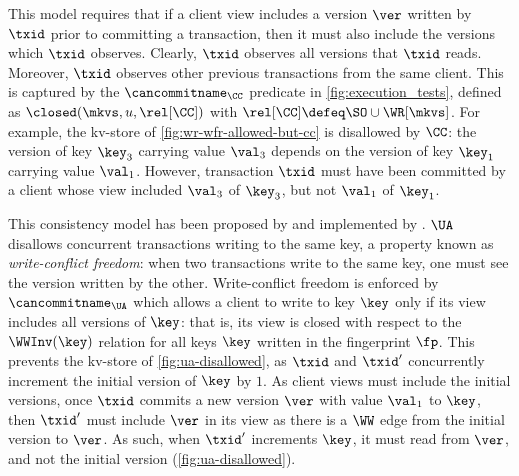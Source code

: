 This model requires that 
if a client view includes 
a version \(\ver\) written by \( \txid \) prior to committing a transaction, 
then it must also include the versions which \(\txid\) observes.
Clearly, \(\txid\) observes all versions that \(\txid\) reads. 
Moreover, \(\txid\) observes other previous transactions from the same client.
This is captured by the \(\cancommitname_{\CC}\) predicate in \cref{fig:execution_tests}, 
defined as \(\closed(\mkvs, u, \rel[\CC])\) with \(\rel[\CC] \defeq \SO \cup \WR[\mkvs]\).
For example, the kv-store of \cref{fig:wr-wfr-allowed-but-cc} 
is disallowed by \(\CC\): the version of key \(\key_3\) carrying value \(\val_3\) depends on 
the version of key \(\key_1\) carrying value \(\val_1\). 
However, transaction \(\txid\) must have been committed by a client
whose view included \(\val_3\) of \( \key_3\), but not \(\val_1\) of \( \key_1\).

This consistency model has been proposed by \citet{framework-concur} 
and implemented by \citet{rola}.
\(\UA\) disallows concurrent transactions writing to the same key,
a property known as \emph{write-conflict freedom}:  
when two transactions write to the same key, one must see the version 
written by the other.
Write-conflict freedom is enforced by \(\cancommitname_{\UA}\) which allows a client to write to key \(\key\) only if its view includes all versions of \(\key\):
that is, its view is closed with respect to the \(\WWInv(\key)\) relation for all keys \(\key\) written in the fingerprint \(\fp\).
This prevents the kv-store of \cref{fig:ua-disallowed},
as \(\txid\) and \(\txid'\) concurrently increment the initial version of \(\key\) by \(1\).
As client views must include the initial versions, once \(\txid\) commits a new version \(\ver\) with value \(\val_1\) to \(\key\), then \(\txid'\) must include \(\ver\) in its view as there is a \(\WW\) edge from the initial version to \(\ver\). 
As such, when \(\txid'\) increments \(\key\), it must read from \(\ver\), and not the initial version (\cref{fig:ua-disallowed}).

